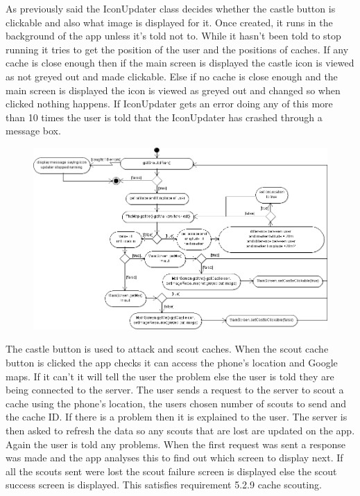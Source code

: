 As previously said the IconUpdater class decides whether the castle button is clickable and also what image is displayed for it. Once created, it runs in the background of the app unless it's told not to. While it hasn't been told to stop running it tries to get the position of the user and the positions of caches. If any cache is close enough then if the main screen is displayed the castle icon is viewed as not greyed out and made clickable. Else if no cache is close enough and the main screen is displayed the icon is viewed as greyed out and changed so when clicked nothing happens. If IconUpdater gets an error doing any of this more than 10 times the user is told that the IconUpdater has crashed through a message box.

\newpage
\begin{figure}
    \centering
    \includegraphics[width=\textwidth]{images/activity/iconUpdator}
\end{figure}

The castle button is used to attack and scout caches. When the scout cache button is clicked the app checks it can access the phone's location and Google maps. If it can't it will tell the user the problem else the user is told they are being connected to the server. The user sends a request to the server to scout a cache using the phone's location, the users chosen number of scouts to send and the cache ID. If there is a problem then it is explained to the user. The server is then asked to refresh the data so any scouts that are lost are updated on the app. Again the user is told any problems. When the first request was sent a response was made and the app analyses this to find out which screen to display next. If all the scouts sent were lost the scout failure screen is displayed else the scout success screen is displayed. This satisfies requirement 5.2.9 cache scouting.

